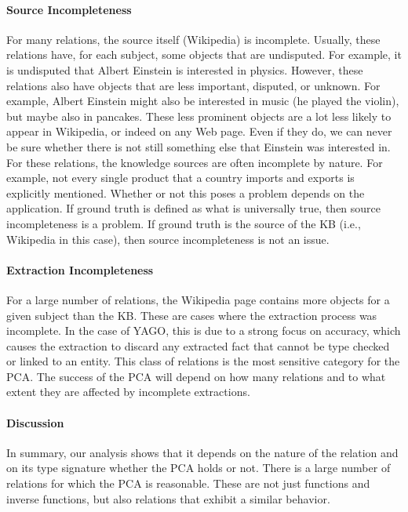 \paragraph{Source Incompleteness} For many relations, the source itself (Wikipedia) is incomplete.
Usually, these relations have, for each subject, some objects that are undisputed.
For example, it is undisputed that Albert Einstein is interested in physics. However, these relations also have objects that are less important, disputed, or unknown.
For example, Albert Einstein might also be interested in music (he played the violin), but maybe also in pancakes.
These less prominent objects are a lot less likely to appear in Wikipedia, or indeed on any Web page.
Even if they do, we can never be sure whether there is not still something else that Einstein was interested in.
For these relations, the knowledge sources are often incomplete by nature.
For example, not every single product that a country imports and exports is explicitly mentioned.
Whether or not this poses a problem depends on the application.
If ground truth is defined as what is universally true, then source incompleteness is a problem.
If ground truth is the source of the KB (i.e., Wikipedia in this case), then source incompleteness is not an issue.



\paragraph{Extraction Incompleteness} For a large number of relations, the Wikipedia page contains more objects for a given subject than the KB.
These are cases where the extraction process was incomplete.
In the case of YAGO, this is due to a strong focus on accuracy,
which causes the extraction to discard any extracted fact that cannot be type checked or linked to an entity.
This class of relations is the most sensitive category for the PCA.
The success of the PCA will depend on how many relations and to what extent they are affected by incomplete extractions.

\paragraph{Discussion} In summary, our analysis shows that it depends on the nature of the relation and on its type signature whether the PCA holds or not.
 There is a large number of relations for which the PCA is reasonable.
These are not just functions and inverse functions, but also relations that exhibit a similar behavior.

